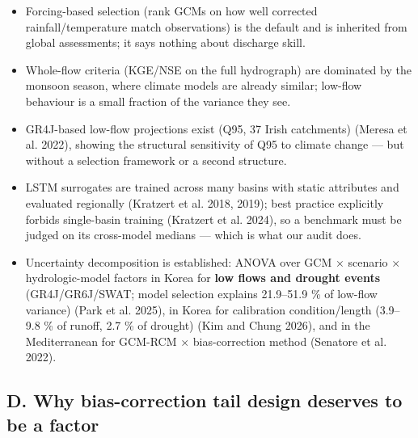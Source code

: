 \documentclass[
  11pt,
]{article}
\providecommand{\tightlist}{%
  \setlength{\itemsep}{0pt}\setlength{\parskip}{0pt}}
\begin{document}
\begin{itemize}
\tightlist
\item
  Forcing-based selection (rank GCMs on how well corrected
  rainfall/temperature match observations) is the default and is
  inherited from global assessments; it says nothing about discharge
  skill.
\item
  Whole-flow criteria (KGE/NSE on the full hydrograph) are dominated by
  the monsoon season, where climate models are already similar; low-flow
  behaviour is a small fraction of the variance they see.
\item
  GR4J-based low-flow projections exist (Q95, 37 Irish catchments)
  (Meresa et al. 2022), showing the structural sensitivity of Q95 to
  climate change --- but without a selection framework or a second
  structure.
\item
  LSTM surrogates are trained across many basins with static attributes
  and evaluated regionally (Kratzert et al. 2018, 2019); best practice
  explicitly forbids single-basin training (Kratzert et al. 2024), so a
  benchmark must be judged on its cross-model medians --- which is what
  our audit does.
\item
  Uncertainty decomposition is established: ANOVA over GCM × scenario ×
  hydrologic-model factors in Korea for \textbf{low flows and drought
  events} (GR4J/GR6J/SWAT; model selection explains 21.9--51.9 \% of
  low-flow variance) (Park et al. 2025), in Korea for calibration
  condition/length (3.9--9.8 \% of runoff, 2.7 \% of drought) (Kim and
  Chung 2026), and in the Mediterranean for GCM-RCM × bias-correction
  method (Senatore et al. 2022).
\end{itemize}

\subsection{D. Why bias-correction tail design deserves to be a
factor}\label{d.-why-bias-correction-tail-design-deserves-to-be-a-factor}
\end{document}
